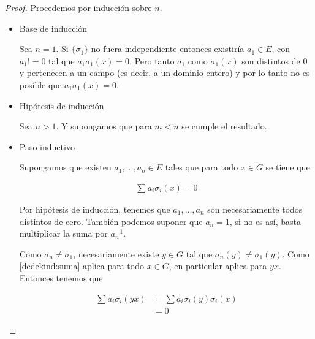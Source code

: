 \begin{proof}
    Procedemos por inducción sobre $n$. 
    
    \begin{itemize}
        \item Base de inducción\par\null
            Sea $n = 1$. Si $\{\sigma_1\}$ no fuera independiente entonces existiría $a_1 \in E$, con $a_1 != 0$ 
            tal que $a_1 \sigma_1(x) = 0$. Pero tanto $a_1$ como $\sigma_1(x)$ son distintos de $0$ y pertenecen a un campo
            (es decir, a un dominio entero) y por lo tanto no es posible que $a_1 \sigma_1(x) = 0$.\par\null   
                    
         \item Hipótesis de inducción\par\null
            Sea $n>1$. Y supongamos que para $m < n$ se cumple el resultado.\par\null
                    
         \item Paso inductivo\par\null
            Supongamos que existen $a_1, \dots, a_n \in E$ tales que para todo $x \in G$ se tiene que
                  
            \begin{align}
                    \sum a_i \sigma_i(x) = 0 \label{dedekind:suma} 
            \end{align}\par\null
            
            Por hipótesis de inducción, tenemos que $a_1, \dots, a_n$ son necesariamente todos distintos de cero.
            También podemos suponer que $a_n = 1$, si no es así, basta multiplicar la suma por $a_n^{-1}$.\par\null
            
            Como $\sigma_n \not= \sigma_1$, necesariamente existe $y \in G$ tal que $\sigma_n(y) \not= \sigma_1(y)$.
            Como \eqref{dedekind:suma} aplica para todo $x \in G$, en particular aplica para $yx$. Entonces tenemos que
    
            \begin{align}
                    \sum a_i \sigma_i(yx)   &=  \sum a_i \sigma_i(y)\sigma_i(x) \\
                                            &=  0 
            \end{align}
            

\end{itemize}
\end{proof}
